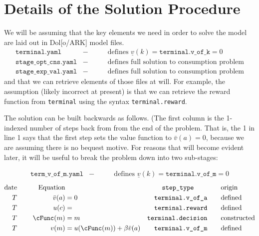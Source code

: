 \documentclass[\econtexRoot/BufferStockTheory]{subfiles}
\newcommand{\EOP}{\bar}
\newcommand{\MOP}{}
\newcommand{\BOP}{\underline}
\begin{document}

\section{Details of the Solution Procedure}\label{sec:ApndxSolutionSteps}

\makeatletter
\newcommand{\leqnomode}{\tagsleft@true}
\newcommand{\reqnomode}{\tagsleft@false}
\renewcommand\tagform@[1]{\maketag@@@{\ignorespaces#1\unskip\@@italiccorr}}
\makeatother
\leqnomode
\small

We will be assuming that the key elements we need in order to solve the model are laid out in Dol[o/ARK] model files.
\begin{align*}
  \texttt{terminal.yaml} & - & \qquad \text{defines }\BOP{v}(k)=\texttt{terminal.v\_of\_k}=0
 \\ \texttt{stage\_opt\_cns.yaml} & - & \qquad \text{defines full solution to consumption problem}
 \\ \texttt{stage\_exp\_val.yaml} & - & \qquad \text{defines full solution to consumption problem}
\end{align*}
and that we can retrieve elements of those files at will.
For example, the assumption (likely incorrect at present) is that we can retrieve the reward function from \texttt{terminal} using the syntax \texttt{terminal.reward}.

\pagebreak
The solution can be built backwards as follows.
(The first column is the 1-indexed number of steps back from from the end of the problem.
That is, the 1 in line 1 says that the first step sets the value function to $\EOP{v}(a)=0$, because we are assuming there is no bequest motive.
For reasons that will become evident later, it will be useful to break the problem down into two sub-stages:


\begin{align*}
  \texttt{term\_v\_of\_m.yaml} & - & \qquad \text{defines }\BOP{v}(k)=\texttt{terminal.v\_of\_m}=0
\end{align*}
\begin{alignat}{3}
\text{date} &      &   \notag \text{Equation} & \qquad                       & \qquad \texttt{step\_type} \qquad & \qquad \text{origin}
\\ T        & ~~~~ &   \EOP{v}(a)             & = 0                          & \texttt{terminal.v\_of\_a}        & \qquad \text{defined}
\\ T        & ~~~~ &   u(c)                   & =                            & \texttt{terminal.reward}          & \qquad \text{defined}
\\ T        & ~~~~ &   \cFunc(m)                   & = m                          & \texttt{terminal.decision}        & \qquad \text{constructed} \label{step:cFuncmake}
\\ T        & ~~~~ & \MOP{v}(m)               & = u(\cFunc(m)) + \beta \EOP{v}(a) & \texttt{terminal.v\_of\_m}        & \qquad \text{defined}
\end{alignat}
\end{document}
